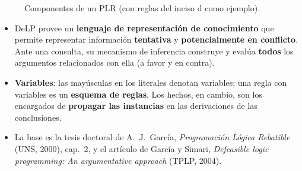 \documentclass[11pt,a4paper]{article}
\newcommand{\nf}{\textasciitilde}                 %
\newcommand{\reb}{\mathrel{-\!\!\!\prec}}         %
\newcommand{\est}{\leftarrow}                      %
\newcommand{\regla}[3]{\text{\texttt{#1}}~\ensuremath{#2}~\text{\texttt{#3}}}
\begin{document}
\begin{figure}[h]
\centering
{}
\caption{Componentes de un PLR (con reglas del inciso d como ejemplo).}
\end{figure}

\begin{extras}
\begin{itemize}
  \item DeLP provee un \textbf{lenguaje de representación de conocimiento} que permite representar información \textbf{tentativa} y \textbf{potencialmente en conflicto}. Ante una consulta, su mecanismo de inferencia construye y evalúa \textbf{todos} los argumentos relacionados con ella (a favor y en contra).
  \item \textbf{Variables}: las mayúsculas en los literales denotan variables; una regla con variables es un \textbf{esquema de reglas}. Los hechos, en cambio, son los encargados de \textbf{propagar las instancias} en las derivaciones de las conclusiones.
  \item La base es la tesis doctoral de A.~J.~García, \textit{Programación Lógica Rebatible} (UNS, 2000), cap.~2, y el artículo de García y Simari, \textit{Defeasible logic programming: An argumentative approach} (TPLP, 2004).
\end{itemize}
\end{extras}

\end{document}
